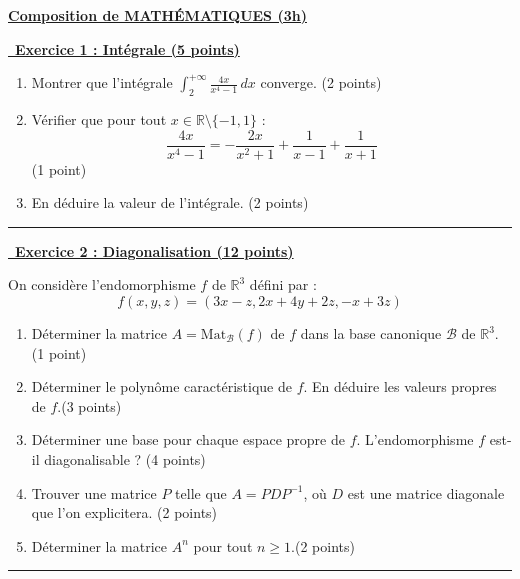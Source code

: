 \documentclass[a4paper,11pt]{article}
\begin{document}
\begin{center}\bf {\Large\underline{Composition de MATH\'EMATIQUES  (3h)}}\end{center}
\hfill\break

\underline {\, \bf{Exercice 1 : Intégrale } \bf{(5 points)}}
\medskip



\begin{enumerate}
    \item Montrer que l'intégrale $\displaystyle \int_{2}^{+\infty} \frac{4x}{x^4 - 1} \, dx$ converge. (2 points)
    \item Vérifier que pour tout $x \in \mathbb{R} \setminus \{-1, 1\}$ :
    \[ \frac{4x}{x^4 - 1} = -\frac{2x}{x^2 + 1} + \frac{1}{x - 1} + \frac{1}{x + 1} \] (1 point)
    \item En déduire la valeur de l'intégrale. (2 points)
\end{enumerate}



\hfill\break
\hrule
\hfill\break


\underline {\, \bf{Exercice 2  : Diagonalisation (12 points)}}
\medskip


\noindent On considère l'endomorphisme $f$ de $\mathbb{R}^3$ défini par :
\[ f(x, y, z) = (3x - z, 2x + 4y + 2z, -x + 3z) \]

\begin{enumerate}
    \item Déterminer la matrice $A = \mathrm{Mat}_{\mathcal{B}}(f)$ de $f$ dans la base canonique $\mathcal{B}$ de $\mathbb{R}^3$. (1 point)
    \item Déterminer le polynôme caractéristique de $f$. En déduire les valeurs propres de $f$.(3 points)
    \item Déterminer une base pour chaque espace propre de $f$. L'endomorphisme $f$ est-il diagonalisable ? (4 points)
    \item Trouver une matrice $P$ telle que $A = PDP^{-1}$, où $D$ est une matrice diagonale que l'on explicitera. (2 points)
    \item Déterminer la matrice $A^n$ pour tout $n \geq 1$.(2 points)
\end{enumerate}




\hfill\break
\hrule
\hfill\break
\end{document}
